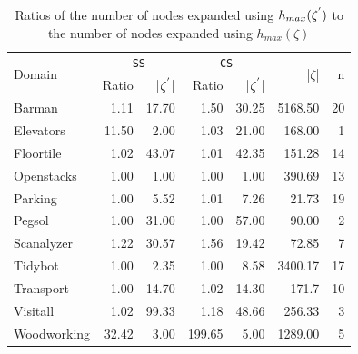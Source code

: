 \begin{table}[]
\centering
\caption{Ratios of the number of nodes expanded using $h_{max}(\zeta\sp{'})$ to the number of nodes expanded using $h_{max}(\zeta)$}
\begin{tabular}{lrrrrrr}
\hline
\multirow{2}{*}{Domain} & \multicolumn{2}{c}{\texttt{SS}} & \multicolumn{2}{c}{\texttt{CS}}   & \multirow{2}{*}{|$\zeta$|} & \multirow{2}{*}{n} \\ \cline{2-5}
                        & Ratio    & |$\zeta\sp{'}$|   & Ratio  & |$\zeta\sp{'}$| &                            &                    \\ \hline
Barman                  & 1.11     & 17.70       & 1.50   & 30.25           & 5168.50                    & 20                 \\
Elevators               & 11.50     & 2.00       & 1.03   & 21.00           & 168.00                     & 1                  \\
Floortile               & 1.02     & 43.07       & 1.01   & 42.35           & 151.28                     & 14                 \\
Openstacks              & 1.00     & 1.00        & 1.00   & 1.00            & 390.69                     & 13                 \\
Parking                 & 1.00     & 5.52        & 1.01   & 7.26            & 21.73                      & 19                 \\
Pegsol                  & 1.00     & 31.00       & 1.00   & 57.00           & 90.00                      & 2                  \\
Scanalyzer              & 1.22     & 30.57       & 1.56   & 19.42           & 72.85                      & 7                  \\
Tidybot                 & 1.00     & 2.35        & 1.00   & 8.58            & 3400.17                    & 17                 \\
Transport               & 1.00     & 14.70        & 1.02   & 14.30           & 171.7                     & 10                  \\
Visitall                & 1.02     & 99.33       & 1.18   & 48.66           & 256.33                     & 3                  \\
Woodworking             & 32.42     & 3.00       & 199.65 & 5.00           & 1289.00                     & 5                  \\ \hline
\end{tabular}
\label{tb_one}
\end{table}

